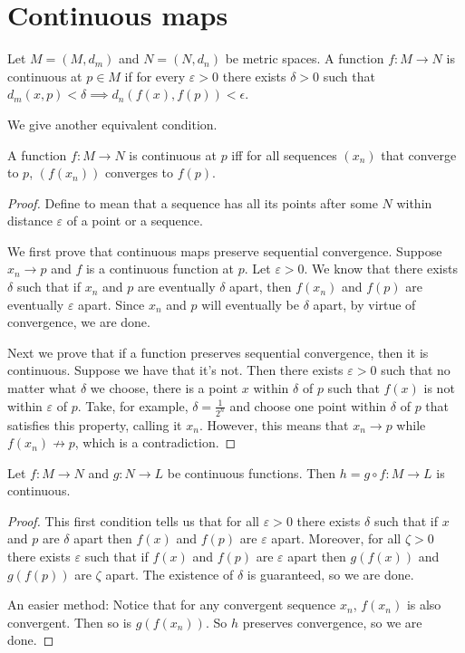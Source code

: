 \documentclass[11pt]{scrreport}
\begin{document}
\section{Continuous maps}
\begin{definition}
    Let $M=(M,d_m)$ and $N=(N,d_n)$ be metric spaces. A function $f: M\to N$ is continuous at $p\in M$ if for every $\varepsilon>0$ there exists $\delta>0$ such that $d_m(x,p)<\delta \implies d_n(f(x),f(p))<\epsilon$. 
\end{definition}
We give another equivalent condition.
\begin{theorem}
    A function $f:M\to N$ is continuous at $p$ iff for all sequences $(x_n)$ that converge to $p$, $(f(x_n))$ converges to $f(p)$.
\end{theorem}
\begin{proof}
    Define  to mean that a sequence has all its points after some $N$ within distance $\varepsilon$ of a point or a sequence.

    We first prove that continuous maps preserve sequential convergence. Suppose $x_n \to p$ and $f$ is a continuous function at $p$. Let $\varepsilon>0$. We know that there exists $\delta$ such that if $x_n$ and $p$ are eventually $\delta$ apart, then $f(x_n)$ and $f(p)$ are eventually $\varepsilon$ apart. Since $x_n$ and $p$ will eventually be $\delta$ apart, by virtue of convergence, we are done.

    Next we prove that if a function preserves sequential convergence, then it is continuous. Suppose we have that it's not. Then there exists $\varepsilon>0$ such that no matter what $\delta$ we choose, there is a point $x$ within $\delta$ of $p$ such that $f(x)$ is not within $\varepsilon$ of $p$. Take, for example, $\delta = \frac{1}{2^n}$ and choose one point within $\delta$ of $p$ that satisfies this property, calling it $x_n$. However, this means that $x_n \to p$ while $f(x_n) \not\to p$, which is a contradiction.
\end{proof}
\begin{proposition}
    Let $f: M\to N$ and $g: N\to L$ be continuous functions. Then $h = g\circ f : M \to L$ is continuous.
\end{proposition}
\begin{proof}
    This first condition tells us that for all $\varepsilon > 0$ there exists $\delta$ such that if $x$ and $p$ are $\delta$ apart then $f(x)$ and $f(p)$ are $\varepsilon$ apart. Moreover, for all $\zeta>0$ there exists $\varepsilon$ such that if $f(x)$ and $f(p)$ are $\varepsilon$ apart then $g(f(x))$ and $g(f(p))$ are $\zeta$ apart. The existence of $\delta$ is guaranteed, so we are done.

    An easier method: Notice that for any convergent sequence $x_n$, $f(x_n)$ is also convergent. Then so is $g(f(x_n))$. So $h$ preserves convergence, so we are done.
\end{proof}
\end{document}
